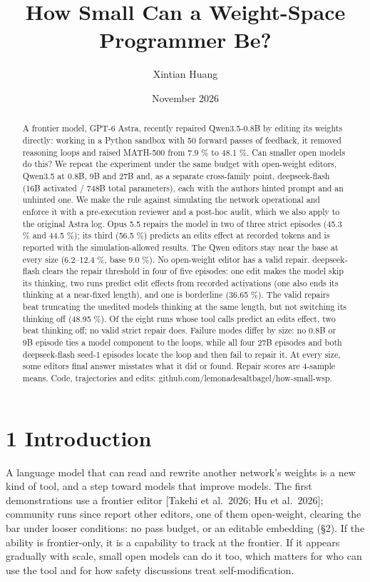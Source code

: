 \documentclass[
  10pt,
]{article}
\title{How Small Can a Weight-Space Programmer Be?}
\author{Xintian Huang}
\date{November 2026}
\begin{document}
\maketitle
\begin{abstract}
A frontier model, GPT-6 Astra, recently repaired Qwen3.5-0.8B by editing
its weights directly: working in a Python sandbox with 50 forward passes
of feedback, it removed reasoning loops and raised MATH-500 from 7.9 \%
to 48.1 \%. Can smaller open models do this? We repeat the experiment
under the same budget with open-weight editors, Qwen3.5 at 0.8B, 9B and
27B and, as a separate cross-family point, deepseek-flash (16B activated
/ 748B total parameters), each with the authors\textquotesingle{} hinted
prompt and an unhinted one. We make the rule against simulating the
network operational and enforce it with a pre-execution reviewer and a
post-hoc audit, which we also apply to the original Astra log. Opus 5.5
repairs the model in two of three strict episodes (45.3 \% and 44.5 \%);
its third (56.5 \%) predicts an edit\textquotesingle s effect at
recorded tokens and is reported with the simulation-allowed results. The
Qwen editors stay near the base at every size (6.2--12.4 \%, base 9.0
\%). No open-weight editor has a valid repair. deepseek-flash clears the
repair threshold in four of five episodes: one edit makes the model skip
its thinking, two runs predict edit effects from recorded activations
(one also ends its thinking at a near-fixed length), and one is
borderline (36.65 \%). The valid repairs beat truncating the unedited
model\textquotesingle s thinking at the same length, but not switching
its thinking off (48.95 \%). Of the eight runs whose tool calls predict
an edit\textquotesingle s effect, two beat thinking off; no valid strict
repair does. Failure modes differ by size: no 0.8B or 9B episode ties a
model component to the loops, while all four 27B episodes and both
deepseek-flash seed-1 episodes locate the loop and then fail to repair
it. At every size, some editor\textquotesingle s final answer misstates
what it did or found. Repair scores are 4-sample means. Code,
trajectories and edits: github.com/lemonadesaltbagel/how-small-wsp.
\end{abstract}

\section{1 Introduction}\label{introduction}

A language model that can read and rewrite another network's weights is
a new kind of tool, and a step toward models that improve models. The
first demonstrations use a frontier editor {[}Takehi et al.~2026; Hu et
al.~2026{]}; community runs since report other editors, one of them
open-weight, clearing the bar under looser conditions: no pass budget,
or an editable embedding (\S{}2). If the ability is frontier-only, it is a
capability to track at the frontier. If it appears gradually with scale,
small open models can do it too, which matters for who can use the tool
and for how safety discussions treat self-modification.
\end{document}
